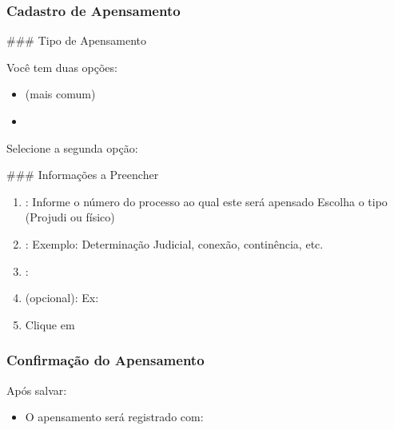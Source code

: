 \documentclass[letterpaper,10pt,brazil]{sphinxmanual}
\begin{document}
\subsubsection{Cadastro de Apensamento}
\label{\detokenize{projud_28_apensamentos:cadastro-de-apensamento}}
\sphinxAtStartPar
\#\#\# Tipo de Apensamento

\sphinxAtStartPar
Você tem duas opções:
\begin{itemize}
\item {} 
\sphinxAtStartPar
{} (mais comum)

\item {} 
\sphinxAtStartPar
{}

\end{itemize}

\sphinxAtStartPar
Selecione a segunda opção:

\sphinxAtStartPar
\#\#\# Informações a Preencher
\begin{enumerate}
%
\item {} 
\sphinxAtStartPar
{}:
\sphinxhyphen{} Informe o número do processo ao qual este será apensado
\sphinxhyphen{} Escolha o tipo (Projudi ou físico)

\item {} 
\sphinxAtStartPar
{}:
\sphinxhyphen{} Exemplo: Determinação Judicial, conexão, continência, etc.

\item {} 
\sphinxAtStartPar
{}:
\sphinxhyphen{} 
\sphinxhyphen{} 
\sphinxhyphen{} 

\item {} 
\sphinxAtStartPar
{} (opcional):
\sphinxhyphen{} Ex: 

\item {} 
\sphinxAtStartPar
Clique em 

\end{enumerate}


\subsubsection{Confirmação do Apensamento}
\label{\detokenize{projud_28_apensamentos:confirmacao-do-apensamento}}
\sphinxAtStartPar
Após salvar:
\begin{itemize}
\item {} 
\sphinxAtStartPar
O apensamento será registrado com:
\sphinxhyphen{} 
\sphinxhyphen{} 
\sphinxhyphen{} 

\end{itemize}
\end{document}
